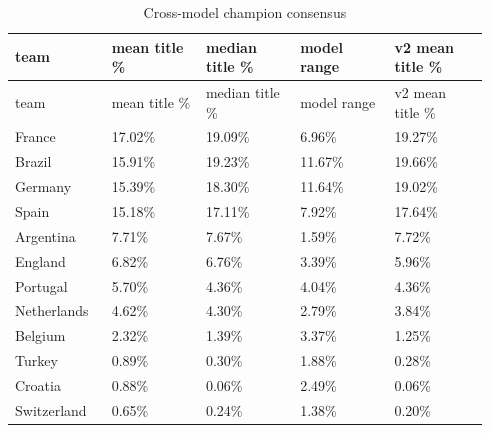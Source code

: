 \documentclass[10pt]{article}
\begin{document}
\begin{longtable}{p{0.188\linewidth}p{0.188\linewidth}p{0.188\linewidth}p{0.188\linewidth}p{0.188\linewidth}}
\caption{Cross-model champion consensus}\\
\toprule
team & mean title \% & median title \% & model range & v2 mean title \% \\
\midrule
\endfirsthead
\toprule
team & mean title \% & median title \% & model range & v2 mean title \% \\
\midrule
\endhead
France & 17.02\% & 19.09\% & 6.96\% & 19.27\% \\
Brazil & 15.91\% & 19.23\% & 11.67\% & 19.66\% \\
Germany & 15.39\% & 18.30\% & 11.64\% & 19.02\% \\
Spain & 15.18\% & 17.11\% & 7.92\% & 17.64\% \\
Argentina & 7.71\% & 7.67\% & 1.59\% & 7.72\% \\
England & 6.82\% & 6.76\% & 3.39\% & 5.96\% \\
Portugal & 5.70\% & 4.36\% & 4.04\% & 4.36\% \\
Netherlands & 4.62\% & 4.30\% & 2.79\% & 3.84\% \\
Belgium & 2.32\% & 1.39\% & 3.37\% & 1.25\% \\
Turkey & 0.89\% & 0.30\% & 1.88\% & 0.28\% \\
Croatia & 0.88\% & 0.06\% & 2.49\% & 0.06\% \\
Switzerland & 0.65\% & 0.24\% & 1.38\% & 0.20\% \\
\bottomrule
\end{longtable}
\end{document}
